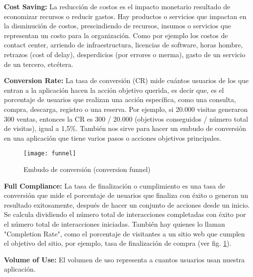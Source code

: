 \begin{description}
  \item {\textbf{Cost Saving:} La reducción de costos es el impacto monetario resultado de economizar recursos o reducir gastos. Hay productos o servicios que impactan en la disminución de costos, prescindiendo de recursos, insumos o servicios que representan un costo para la organización. Como por ejemplo los costos de contact center, arriendo de infraestructura, licencias de software, horas hombre, retrazos (cost of delay), desperdicios (por errores o merma), gasto de un servicio de un tercero, etcétera.
}

  \item {\textbf{Conversion Rate:} La tasa de conversión (CR) mide cuántos usuarios de los que entran a la aplicación hacen la acción objetivo querida, es decir que, es el porcentaje de usuarios que realizan una acción específica, como una consulta, compra, descarga, registro o una reserva. Por ejemplo, si 20.000 visitas generaron 300 ventas, entonces la CR es 300 / 20.000 (objetivos conseguidos / número total de visitas), igual a 1,5\%. También nos sirve para hacer un embudo de conversión en una aplicación que tiene varios pasos o acciones objetivos principales.
}

\begin{figure}[h]
  \centering
  \texttt{[image: funnel]}
  \caption{Embudo de conversión (conversion funnel)}
  \centering
  \label{fig:funnel} %
\end{figure}
\FloatBarrier %


  \item {\textbf{Full Compliance:} La tasa de finalización o cumplimiento es una tasa de conversión que mide el porcentaje de usuarios que finaliza con éxito o generan un resultado exitosamente, después de hacer un conjunto de acciones desde un inicio. Se calcula dividiendo el número total de interacciones completadas con éxito por el número total de interacciones iniciadas. También hay quienes lo llaman "Completion Rate", como el porcentaje de visitantes a un sitio web que cumplen el objetivo del sitio, por ejemplo, tasa de finalización de compra (ver fig. \ref{fig:funnel}). 
}

  \item {\textbf{Volume of Use:} El volumen de uso representa a cuantos usuarios usan nuestra aplicación.
}


\end{description}
